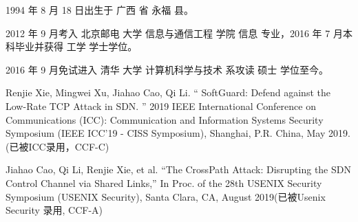 \begin{resume}


  1994 年 8 月 18 日出生于 广西 省 永福 县。

  2012 年 9 月考入 北京邮电 大学 信息与通信工程 学院 信息 专业，2016 年 7 月本科毕业并获得 工学 学士学位。

  2016 年 9 月免试进入 清华 大学 计算机科学与技术 系攻读 硕士 学位至今。



  \begin{publications}[before=\publicationskip,after=\publicationskip]

    \item Renjie Xie, Mingwei Xu, Jiahao Cao, Qi Li. “ SoftGuard: Defend against the Low-Rate TCP Attack in SDN. ” 2019 IEEE International Conference on Communications (ICC): Communication and Information Systems Security Symposium (IEEE ICC'19 - CISS Symposium), Shanghai, P.R. China, May 2019. (已被ICC录用，CCF-C)

    
    
  \end{publications}

  \begin{publications}
    \item Jiahao Cao, Qi Li, Renjie Xie, et al. “The CrossPath Attack: Disrupting the SDN Control Channel via Shared Links,” In Proc. of the 28th USENIX Security Symposium (USENIX Security), Santa Clara, CA, August 2019(已被Usenix Security 录用, CCF-A)
  \end{publications}


\end{resume}
